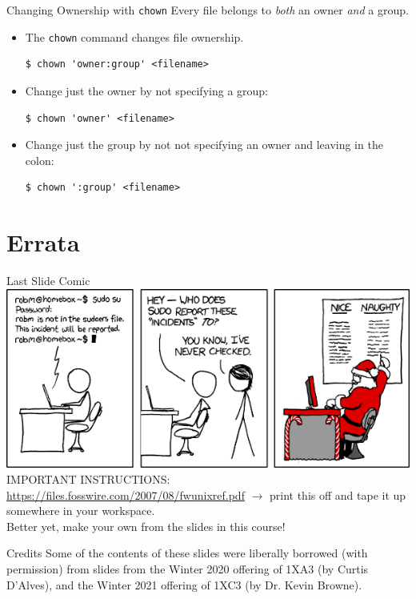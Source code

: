 \documentclass[11pt]{beamer}
\begin{document}
\begin{frame}[fragile=singleslide]{Changing Ownership with \texttt{chown}}
Every file belongs to \emph{both} an owner \emph{and} a group.
\begin{itemize}
\item The \texttt{chown} command changes file ownership.
\begin{lstlisting}[style=terminal]
$ chown 'owner:group' <filename>
\end{lstlisting}
\item Change just the owner by not specifying a group:
\begin{lstlisting}[style=terminal]
$ chown 'owner' <filename>
\end{lstlisting}
\item Change just the group by not not specifying an owner and leaving in the colon:
\begin{lstlisting}[style=terminal]
$ chown ':group' <filename>
\end{lstlisting}
\end{itemize}
\end{frame}

\section[Errata]{Errata}
\begin{frame}{Last Slide Comic}
\center
\includegraphics[scale=0.48]{incident.png} \\
IMPORTANT INSTRUCTIONS: \\
\url{https://files.fosswire.com/2007/08/fwunixref.pdf} $\rightarrow$ print this off and tape it up somewhere in your workspace. \\
Better yet, make your own from the slides in this course! 
\end{frame}

\begin{frame}{Credits}
\center
\vspace{8em}
Some of the contents of these slides were liberally borrowed (with permission) from slides from the Winter 2020 offering of 1XA3 (by Curtis D'Alves), and the Winter 2021 offering of 1XC3 (by Dr. Kevin Browne).  
\end{frame}
\end{document}
